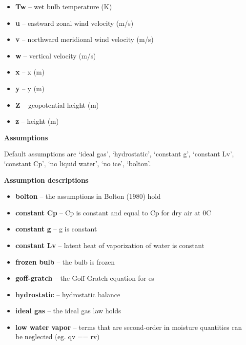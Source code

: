 \documentclass[letterpaper,10pt,english]{sphinxmanual}
\begin{document}
\begin{fulllineitems}
\begin{itemize}
\item {} 
\textbf{Tw} -- wet bulb temperature (K)

\item {} 
\textbf{u} -- eastward zonal wind velocity (m/s)

\item {} 
\textbf{v} -- northward meridional wind velocity (m/s)

\item {} 
\textbf{w} -- vertical velocity (m/s)

\item {} 
\textbf{x} -- x (m)

\item {} 
\textbf{y} -- y (m)

\item {} 
\textbf{Z} -- geopotential height (m)

\item {} 
\textbf{z} -- height (m)

\end{itemize}

\textbf{Assumptions}

Default assumptions are `ideal gas', `hydrostatic', `constant g', `constant Lv',
`constant Cp', `no liquid water', `no ice', `bolton'.

\textbf{Assumption descriptions}
\begin{itemize}
\item {} 
\textbf{bolton} -- the assumptions in Bolton (1980) hold

\item {} 
\textbf{constant Cp} -- Cp is constant and equal to Cp for dry air at 0C

\item {} 
\textbf{constant g} -- g is constant

\item {} 
\textbf{constant Lv} -- latent heat of vaporization of water is constant

\item {} 
\textbf{frozen bulb} -- the bulb is frozen

\item {} 
\textbf{goff-gratch} -- the Goff-Gratch equation for es

\item {} 
\textbf{hydrostatic} -- hydrostatic balance

\item {} 
\textbf{ideal gas} -- the ideal gas law holds

\item {} 
\textbf{low water vapor} -- terms that are second-order in moisture quantities can be neglected (eg. qv == rv)


\end{itemize}
\end{fulllineitems}
\end{document}
